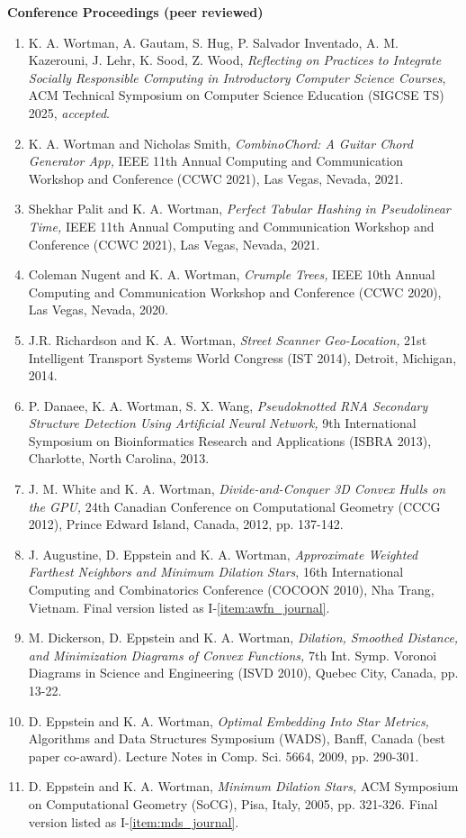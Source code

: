 \documentclass[11pt]{letter}
\begin{document}
\renewcommand{\labelenumi}{C-\arabic{enumi}.}
\textbf{Conference Proceedings (peer reviewed)}
\begin{enumerate}
\item \label{item:sigcse24etal} K. A. Wortman, A. Gautam, S. Hug, P. Salvador Inventado, A. M. Kazerouni, J. Lehr, K. Sood, Z. Wood, \emph{Reflecting on Practices to Integrate Socially Responsible Computing in Introductory Computer Science Courses}, ACM Technical Symposium on Computer Science Education (SIGCSE TS) 2025, \emph{accepted}.
\item \label{item:ccwc21smith} K. A. Wortman and Nicholas Smith, \emph{CombinoChord: A Guitar Chord Generator App,} IEEE 11th Annual Computing and Communication Workshop and Conference (CCWC 2021), Las Vegas, Nevada, 2021.
\item \label{item:ccwc21palit} Shekhar Palit and K. A. Wortman, \emph{Perfect Tabular Hashing in Pseudolinear Time,} IEEE 11th Annual Computing and Communication Workshop and Conference (CCWC 2021), Las Vegas, Nevada, 2021.
\item \label{item:ccwc20} Coleman Nugent and K. A. Wortman, \emph{Crumple Trees,} IEEE 10th Annual Computing and Communication Workshop and Conference (CCWC 2020), Las Vegas, Nevada, 2020.
\item \label{item:its14} J.R. Richardson and K. A. Wortman, \emph{Street Scanner Geo-Location,} 21st Intelligent Transport Systems World Congress (IST 2014), Detroit, Michigan, 2014.
\item \label{item:isbra13} P. Danaee, K. A. Wortman, S. X. Wang, \emph{Pseudoknotted RNA Secondary Structure Detection Using Artificial Neural Network,} 9th International Symposium on Bioinformatics Research and Applications (ISBRA 2013), Charlotte, North Carolina, 2013.
\item \label{item:cccg12} J. M. White and K. A. Wortman, \emph{Divide-and-Conquer 3D Convex Hulls on the GPU,} 24th Canadian Conference on Computational Geometry (CCCG 2012), Prince Edward Island, Canada, 2012, pp. 137-142.
\item \label{item:awfn_conference} J. Augustine, D. Eppstein and K. A. Wortman, \emph{Approximate Weighted Farthest Neighbors and Minimum Dilation Stars}, 16th International Computing and Combinatorics Conference (COCOON 2010), Nha Trang, Vietnam.  Final version listed as I-\ref{item:awfn_journal}.
\item M. Dickerson, D. Eppstein and K. A. Wortman, \emph{Dilation, Smoothed Distance, and Minimization Diagrams of Convex Functions,} 7th Int. Symp. Voronoi Diagrams in Science and Engineering (ISVD 2010), Quebec City, Canada, pp. 13-22.
\item \label{item:star_metrics} D. Eppstein and K. A. Wortman, \emph{Optimal Embedding Into Star Metrics,} Algorithms and Data Structures Symposium (WADS), Banff, Canada (best paper co-award).  Lecture Notes in Comp. Sci. 5664, 2009, pp. 290-301.
\item \label{item:mds_conference} D. Eppstein and K. A. Wortman, \emph{Minimum Dilation Stars,} ACM Symposium on Computational Geometry (SoCG), Pisa, Italy, 2005, pp. 321-326.  Final version listed as I-\ref{item:mds_journal}.
\end{enumerate}
\end{document}
